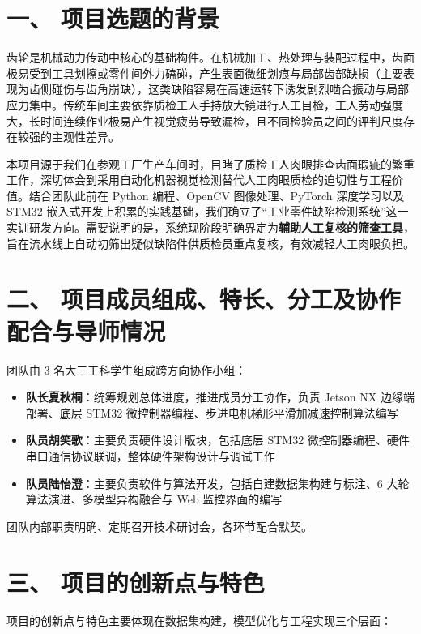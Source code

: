 \section*{一、 项目选题的背景}

齿轮是机械动力传动中核心的基础构件。在机械加工、热处理与装配过程中，齿面极易受到工具划擦或零件间外力磕碰，产生表面微细划痕与局部齿部缺损（主要表现为齿侧碰伤与齿角崩缺），这类缺陷容易在高速运转下诱发剧烈啮合振动与局部应力集中。传统车间主要依靠质检工人手持放大镜进行人工目检，工人劳动强度大，长时间连续作业极易产生视觉疲劳导致漏检，且不同检验员之间的评判尺度存在较强的主观性差异。

本项目源于我们在参观工厂生产车间时，目睹了质检工人肉眼排查齿面瑕疵的繁重工作，深切体会到采用自动化机器视觉检测替代人工肉眼质检的迫切性与工程价值。结合团队此前在 Python 编程、OpenCV 图像处理、PyTorch 深度学习以及 STM32 嵌入式开发上积累的实践基础，我们确立了“工业零件缺陷检测系统”这一实训研发方向。需要说明的是，系统现阶段明确界定为\textbf{辅助人工复核的筛查工具}，旨在流水线上自动初筛出疑似缺陷件供质检员重点复核，有效减轻人工肉眼负担。

\section*{二、 项目成员组成、特长、分工及协作配合与导师情况}

团队由 3 名大三工科学生组成跨方向协作小组：
\begin{itemize}
    \item \textbf{队长夏秋桐}：统筹规划总体进度，推进成员分工协作，负责 Jetson NX 边缘端部署、底层 STM32 微控制器编程、步进电机梯形平滑加减速控制算法编写
    \item \textbf{队员胡笑歌}：主要负责硬件设计版块，包括底层 STM32 微控制器编程、硬件串口通信协议联调，整体硬件架构设计与调试工作
    \item \textbf{队员陆怡澄}：主要负责软件与算法开发，包括自建数据集构建与标注、6 大轮算法演进、多模型异构融合与 Web 监控界面的编写
\end{itemize}

团队内部职责明确、定期召开技术研讨会，各环节配合默契。

\section*{三、 项目的创新点与特色}

项目的创新点与特色主要体现在数据集构建，模型优化与工程实现三个层面：

